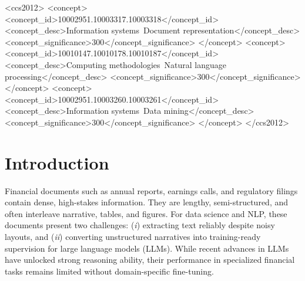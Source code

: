 \documentclass[sigconf,authordraft,anonymous]{acmart}
\begin{document}
\begin{CCSXML}
<ccs2012>
 <concept>
  <concept_id>10002951.10003317.10003318</concept_id>
  <concept_desc>Information systems~Document representation</concept_desc>
  <concept_significance>300</concept_significance>
 </concept>
 <concept>
  <concept_id>10010147.10010178.10010187</concept_id>
  <concept_desc>Computing methodologies~Natural language processing</concept_desc>
  <concept_significance>300</concept_significance>
 </concept>
 <concept>
  <concept_id>10002951.10003260.10003261</concept_id>
  <concept_desc>Information systems~Data mining</concept_desc>
  <concept_significance>300</concept_significance>
 </concept>
</ccs2012>
\end{CCSXML}



\maketitle

\section{Introduction}
Financial documents such as annual reports, earnings calls, and regulatory filings contain dense, high-stakes information. They are lengthy, semi-structured, and often interleave narrative, tables, and figures. For data science and NLP, these documents present two challenges: (\emph{i}) extracting text reliably despite noisy layouts, and (\emph{ii}) converting unstructured narratives into training-ready supervision for large language models (LLMs). While recent advances in LLMs have unlocked strong reasoning ability, their performance in specialized financial tasks remains limited without domain-specific fine-tuning.
\end{document}
